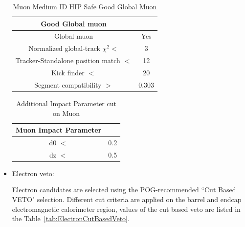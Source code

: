 \begin{itemize}
\begin{table}[htbp]
\fontsize{10 pt}{1.2 em}
\selectfont
\begin{centering}
\caption{\label{tab:MuonMediumIDGoodGlobalMuon} Muon Medium ID HIP Safe Good Global Muon}
\hspace*{-4ex}
\begin{lrbox}{\closureBox}
\begin{tabular}{|c|c|}
\hline
  Good Global muon                      &       \\
\hline
  Global muon                           & Yes   \\
\hline
  Normalized global-track $\chi^{2} <$  & 3     \\
\hline
  Tracker-Standalone position match $<$ & 12    \\
\hline
  Kick finder $<$                       & 20    \\
\hline
  Segment compatibility $>$             & 0.303 \\
\hline
\end{tabular}
\end{lrbox}
\scalebox{0.80}{\usebox{\closureBox}}
\par\end{centering}
\end{table}

\begin{table}[htbp]
\fontsize{10 pt}{1.2 em}
\selectfont
\begin{centering}
\caption{\label{tab:MuonMediumIDImpactParameter} Additional Impact Parameter cut on Muon }
\hspace*{-4ex}
\begin{lrbox}{\closureBox}
\begin{tabular}{|c|c|}
\hline
  Muon Impact Parameter &     \\
\hline
  d0 $<$                & 0.2 \\
\hline
  dz $<$                & 0.5 \\
\hline
\end{tabular}
\end{lrbox}
\scalebox{0.80}{\usebox{\closureBox}}
\par\end{centering}
\end{table}

\item Electron veto:

Electron candidates are selected using the POG-recommended
``Cut Based VETO" selection. 
Different cut criteria are applied on the barrel and endcap electromagnetic calorimeter region, values of the cut based veto are listed in the Table~\ref{tab:ElectronCutBasedVeto}. 


\end{itemize}
